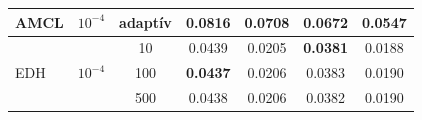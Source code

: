 \documentclass{beamer}
\begin{document}
\begin{frame}
\begin{table}[]
\begin{tabular}{lllllll}
            \hline
            \multicolumn{1}{|l|}{AMCL}                        & \multicolumn{1}{c|}{$10^{-4}$}                                   & \multicolumn{1}{c|}{adaptív}                                     & \multicolumn{1}{c|}{0.0816}                     & \multicolumn{1}{c|}{0.0708}                     & \multicolumn{1}{c|}{0.0672}                     & \multicolumn{1}{c|}{0.0547}                     \\ \hline
            \multicolumn{1}{|l|}{\multirow{3}{*}{EDH}}        & \multicolumn{1}{c|}{\multirow{3}{*}{$10^{-4}$}}                  & \multicolumn{1}{c|}{10}                                          & \multicolumn{1}{c|}{0.0439}                     & \multicolumn{1}{c|}{0.0205}                     & \multicolumn{1}{c|}{\textbf{0.0381}}            & \multicolumn{1}{c|}{0.0188}                     \\ \cline{3-7}
            \multicolumn{1}{|l|}{}                            & \multicolumn{1}{c|}{}                                            & \multicolumn{1}{c|}{100}                                         & \multicolumn{1}{c|}{\textbf{0.0437}}            & \multicolumn{1}{c|}{0.0206}                     & \multicolumn{1}{c|}{0.0383}                     & \multicolumn{1}{c|}{0.0190}                     \\ \cline{3-7}
            \multicolumn{1}{|l|}{}                            & \multicolumn{1}{c|}{}                                            & \multicolumn{1}{c|}{500}                                         & \multicolumn{1}{c|}{0.0438}                     & \multicolumn{1}{c|}{0.0206}                     & \multicolumn{1}{c|}{0.0382}                     & \multicolumn{1}{c|}{0.0190}                     \\ \hline
        \end{tabular}
    \end{table}



\end{frame}
\end{document}
